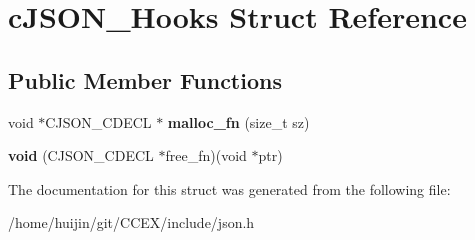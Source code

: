 \hypertarget{structcJSON__Hooks}{\section{c\-J\-S\-O\-N\-\_\-\-Hooks Struct Reference}
\label{structcJSON__Hooks}
}
\subsection*{Public Member Functions}
\begin{DoxyCompactItemize}
\item 
\hypertarget{structcJSON__Hooks_a71693d8b277a80a1faf8758b9589d670}{void $\ast$C\-J\-S\-O\-N\-\_\-\-C\-D\-E\-C\-L $\ast$ {\bfseries malloc\-\_\-fn} (size\-\_\-t sz)}\label{structcJSON__Hooks_a71693d8b277a80a1faf8758b9589d670}

\item 
\hypertarget{structcJSON__Hooks_a42c96b388103ffb466e7335b9fc710c3}{{\bfseries void} (C\-J\-S\-O\-N\-\_\-\-C\-D\-E\-C\-L $\ast$free\-\_\-fn)(void $\ast$ptr)}\label{structcJSON__Hooks_a42c96b388103ffb466e7335b9fc710c3}

\end{DoxyCompactItemize}


The documentation for this struct was generated from the following file\-:\begin{DoxyCompactItemize}
\item 
/home/huijin/git/\-C\-C\-E\-X/include/json.\-h\end{DoxyCompactItemize}
